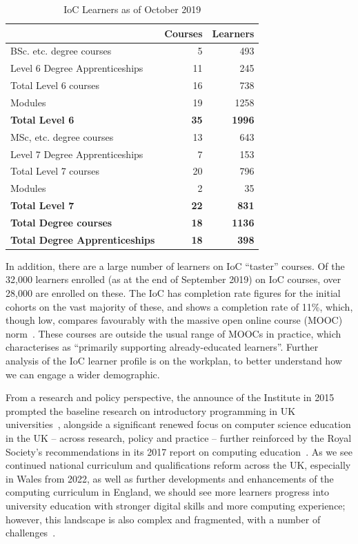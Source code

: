 \documentclass[conference]{IEEEtran}
\begin{document}
\begin{table}
  \begin{center}
\caption{IoC Learners as of October 2019\label{tab:data}}
\begin{tabular}{lrr}
  &Courses&Learners\\
    \hline
	BSc. etc. degree courses&5&493\\
	Level 6 Degree Apprenticeships&11&245\\
	Total Level 6 courses&16&738\\
	Modules&19&1258\\
	{\textbf{Total Level 6}}&{\textbf{35}}&{\textbf{1996}}\\\hline
	MSc, etc. degree courses&13&643\\
	Level 7 Degree Apprenticeships&7&153\\
	Total Level 7 courses&20&796\\
	Modules&2&35\\
	{\textbf{Total Level 7}}&{\textbf{22}}&{\textbf{831}}\\\hline
{\textbf{Total Degree courses}}&{\textbf{18}}&{\textbf{1136}}\\
  {\textbf{Total Degree Apprenticeships}}&{\textbf{18}}&{\textbf{398}}\\
                                       \hline
\end{tabular}
\end{center}
\end{table}

In addition, there are a large number of learners on IoC ``taster''
courses. Of the 32,000 learners enrolled (as at the end of September
2019) on IoC courses, over 28,000 are enrolled on these.  The IoC has
completion rate figures for the initial cohorts on the vast majority
of these, and shows a completion rate of 11\%, which, though low,
compares favourably with the massive open online course (MOOC)
norm~\cite{ReichRuiperezValiente2019a}. These courses are outside the
usual range of MOOCs in practice, which
\cite{ReichRuiperezValiente2019a} characterises as ``primarily
supporting already-educated learners''.  Further analysis of the IoC
learner profile is on the workplan, to better understand how we can
engage a wider demographic.

From a research and policy perspective, the announce of the Institute
in 2015~\cite{HMG2015a} prompted the baseline research on introductory
programming in UK
universities~\cite{murphy-et-al:programming2017,simon-et-al:sigcse2018},
alongside a significant renewed focus on computer science education in
the UK -- across research, policy and practice -- further reinforced
by the Royal Society's recommendations in its 2017 report on computing
education~\cite{rs:2017}. As we see continued national curriculum and
qualifications reform across the UK, especially in Wales from 2022, as
well as further developments and enhancements of the computing
curriculum in England, we should see more learners progress into
university education with stronger digital skills and more computing
experience; however, this landscape is also complex and fragmented,
with a number of challenges~\cite{roehampton:2018}.
\end{document}
